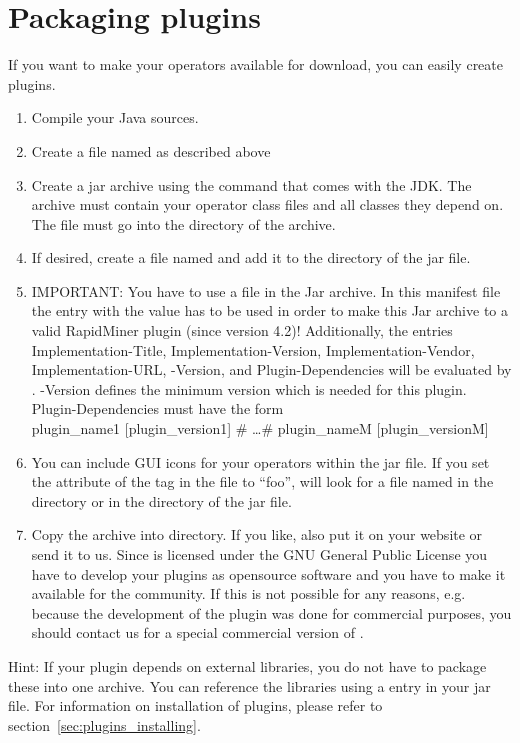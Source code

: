 \section{Packaging plugins}
\label{sec:plugins_packaging}
If you want to make your operators available for download, you can easily
create plugins.
\begin{enumerate}
\item Compile your Java sources.
\item Create a file named  as described above
\item Create a jar archive using the  command that comes with the
  JDK. The archive must contain your operator class files and all classes they
  depend on. The file  must go into the
   directory of the archive.
\item If desired, create a file named  and add it
  to the  directory of the jar file.
\item IMPORTANT: You have to use a  file in the Jar archive.
  In this manifest file the entry  with the value 
   has to be used in order to make this Jar archive
  to a valid RapidMiner plugin (since version 4.2)! Additionally, the entries
  Implementation-Title, Implementation-Version, Implementation-Vendor,
  Implementation-URL, \rapidminer-Version, and Plugin-Dependencies will be evaluated
  by \rapidminer. \rapidminer-Version defines the minimum \rapidminer version which is needed for
  this plugin. Plugin-Dependencies must have the form \\
  plugin\_name1 [plugin\_version1] \# \ldots \# plugin\_nameM [plugin\_versionM]
\item You can include GUI icons for your operators within the
  jar file. If you set the  attribute of the  tag
  in the  file to ``foo'', \rapidminer will look for a
  file named  in the directory
   or in the directory 
   of the jar file.
\item Copy the archive into  directory. If you like, also put
  it on your website or send it to us. Since \rapidminer is licensed under the GNU
  General Public License you have to develop your plugins as opensource
  software and you have to make it available for the \rapidminer community. If this
  is not possible for any reasons, e.g. because the development of the plugin
  was done for commercial purposes, you should contact us for a special
  commercial version of \rapidminer.
\end{enumerate}
Hint: If your plugin depends on external libraries, you do not have to
package these into one archive. You can reference the libraries using a
 entry in your jar  file.
For information on installation of plugins, please refer to
section~\ref{sec:plugins_installing}.




